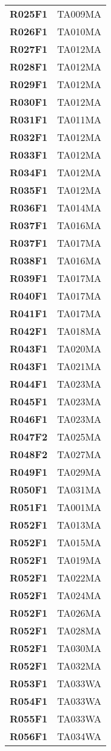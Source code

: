 \documentclass[../../piano-di-qualifica.tex]{subfiles}
\begin{document}
\begin{longtable}[H]{>{\centering\bfseries}m{5cm} >{\centering\arraybackslash}m{5cm}}
  R025F1 &  TA009MA\\
  R026F1 &  TA010MA\\
  R027F1 &  TA012MA\\
  R028F1 &  TA012MA\\
  R029F1 &  TA012MA\\
  R030F1 &  TA012MA\\
  R031F1 &  TA011MA\\
  R032F1 &  TA012MA\\
  R033F1 &  TA012MA\\
  R034F1 &  TA012MA\\
  R035F1 &  TA012MA\\
  R036F1 &  TA014MA\\
  R037F1 &  TA016MA\\
  R037F1 &  TA017MA\\
  R038F1 &  TA016MA\\
  R039F1 &  TA017MA\\
  R040F1 &  TA017MA\\
  R041F1 &  TA017MA\\
  R042F1 &  TA018MA\\
  R043F1 &  TA020MA\\
  R043F1 &  TA021MA\\
  R044F1 &  TA023MA\\
  R045F1 &  TA023MA\\
  R046F1 &  TA023MA\\
  R047F2 &  TA025MA\\
  R048F2 &  TA027MA\\
  R049F1 &  TA029MA\\
  R050F1 &  TA031MA\\
  R051F1 &  TA001MA\\
  R052F1 &  TA013MA\\
  R052F1 &  TA015MA\\
  R052F1 &  TA019MA\\
  R052F1 &  TA022MA\\
  R052F1 &  TA024MA\\
  R052F1 &  TA026MA\\
  R052F1 &  TA028MA\\
  R052F1 &  TA030MA\\
  R052F1 &  TA032MA\\
  R053F1 &  TA033WA\\
  R054F1 &  TA033WA\\
  R055F1 &  TA033WA\\
  R056F1 &  TA034WA\\

\end{longtable}
\end{document}
